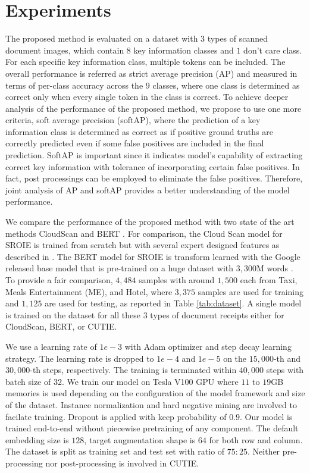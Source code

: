 \documentclass[10pt,twocolumn,letterpaper]{article}
\begin{document}
\section{Experiments}
\label{experiment}
The proposed method is evaluated on a dataset with $3$ types of scanned document images, which contain $8$ key information classes and $1$ don't care class. For each specific key information class, multiple tokens can be included. The overall performance is referred as strict average precision (AP) and measured in terms of per-class accuracy across the $9$ classes, where one class is determined as correct only when every single token in the class is correct. To achieve deeper analysis of the performance of the proposed method, we propose to use one more criteria, soft average precision (softAP), where the prediction of a key information class is determined as correct as if positive ground truths are correctly predicted even if some false positives are included in the final prediction. SoftAP is important since it indicates model's capability of extracting correct key information with tolerance of incorporating certain false positives. In fact, post processings can be employed to eliminate the false positives. Therefore, joint analysis of AP and softAP provides a better understanding of the model performance.

We compare the performance of the proposed method with two state of the art methods CloudScan \cite{cloudscan} and BERT \cite{bert}. For comparison, the Cloud Scan model for SROIE is trained from scratch but with several expert designed features as described in \cite{cloudscan}. The BERT model for SROIE is transform learned with the Google released base model that is pre-trained on a huge dataset with $3,300$M words \cite{bert,bertgit}. To provide a fair comparison, $4,484$ samples with around $1,500$ each from Taxi, Meals Entertainment (ME), and Hotel, where $3,375$ samples are used for training and $1,125$ are used for testing, as reported in Table \ref{tab:dataset}. A single model is trained on the dataset for all these $3$ types of document receipts either for CloudScan, BERT, or CUTIE.

We use a learning rate of $1e-3$ with Adam optimizer and step decay learning strategy. The learning rate is dropped to $1e-4$ and $1e-5$ on the $15,000$-th and $30,000$-th steps, respectively. The training is terminated within $40,000$ steps with batch size of $32$. We train our model on Tesla V100 GPU where $11$ to $19$GB memories is used depending on the configuration of the model framework and size of the dataset. Instance normalization and hard negative mining are involved to facilate training. Dropout is applied with keep probability of $0.9$. Our model is trained end-to-end without piecewise pretraining of any component. The default embedding size is $128$, target augmentation shape is $64$ for both row and column. The dataset is split as training set and test set with ratio of $75:25$. Neither pre-processing nor post-processing is involved in CUTIE.
\end{document}
